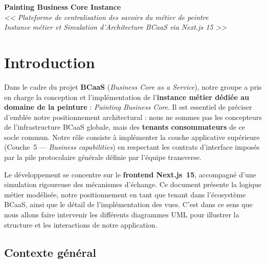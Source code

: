 \documentclass[12pt,a4paper]{report}
\begin{document}
\begin{center}
    {\LARGE\textbf{Painting Business Core Instance}}\\[0.3cm]
    {\Large\textit{<< Plateforme de centralisation des savoirs du métier de peintre\\ Instance métier et Simulation d'Architecture BCaaS via Next.js 15 >>}}\\[1cm]
\end{center}

\tableofcontents
\newpage

\section{Introduction}

Dans le cadre du projet \textbf{BCaaS} (\textit{Business Core as a Service}), notre groupe a pris en charge la conception et l'implémentation de l'\textbf{instance métier dédiée au domaine de la peinture} : \textit{Painting Business Core}. Il est essentiel de préciser d'emblée notre positionnement architectural : nous ne sommes pas les concepteurs de l'infrastructure BCaaS globale, mais des \textbf{tenants consommateurs} de ce socle commun. Notre rôle consiste à implémenter la couche applicative supérieure (Couche~5 --- \textit{Business capabilities}) en respectant les contrats d'interface imposés par la pile protocolaire générale définie par l'équipe transverse.

Le développement se concentre sur le \textbf{frontend Next.js~15}, accompagné d'une simulation rigoureuse des mécanismes d'échange. Ce document présente la logique métier modélisée, notre positionnement en tant que tenant dans l'écosystème BCaaS, ainsi que le détail de l'implémentation des vues. C'est dans ce sens que nous allons faire intervenir les différents diagrammes UML pour illustrer la structure et les interactions de notre application.

\newpage
\subsection*{Contexte général}
\end{document}
